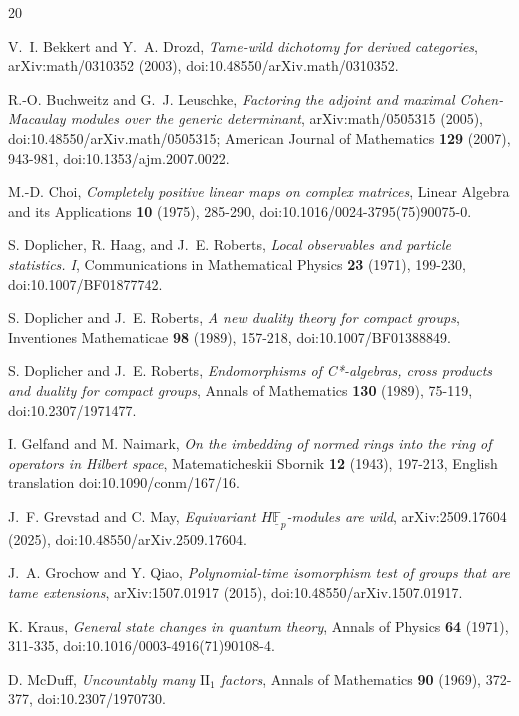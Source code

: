\documentclass[11pt,letterpaper]{article}
\theoremstyle{definition}
\theoremstyle{remark}
\begin{document}
\begin{thebibliography}{20}

V.~I. Bekkert and Y.~A. Drozd,
\emph{Tame-wild dichotomy for derived categories},
arXiv:math/0310352 (2003), doi:10.48550/arXiv.math/0310352.

R.-O. Buchweitz and G.~J. Leuschke,
\emph{Factoring the adjoint and maximal Cohen-Macaulay modules over the generic determinant},
arXiv:math/0505315 (2005), doi:10.48550/arXiv.math/0505315; American Journal of Mathematics \textbf{129} (2007), 943-981, doi:10.1353/ajm.2007.0022.

M.-D. Choi,
\emph{Completely positive linear maps on complex matrices},
Linear Algebra and its Applications \textbf{10} (1975), 285-290, doi:10.1016/0024-3795(75)90075-0.

S. Doplicher, R. Haag, and J.~E. Roberts,
\emph{Local observables and particle statistics. I},
Communications in Mathematical Physics \textbf{23} (1971), 199-230, doi:10.1007/BF01877742.

S. Doplicher and J.~E. Roberts,
\emph{A new duality theory for compact groups},
Inventiones Mathematicae \textbf{98} (1989), 157-218, doi:10.1007/BF01388849.

S. Doplicher and J.~E. Roberts,
\emph{Endomorphisms of C*-algebras, cross products and duality for compact groups},
Annals of Mathematics \textbf{130} (1989), 75-119, doi:10.2307/1971477.

I. Gelfand and M. Naimark,
\emph{On the imbedding of normed rings into the ring of operators in Hilbert space},
Matematicheskii Sbornik \textbf{12} (1943), 197-213, English translation doi:10.1090/conm/167/16.

J.~F. Grevstad and C. May,
\emph{Equivariant $H\underline{\mathbb{F}}_p$-modules are wild},
arXiv:2509.17604 (2025), doi:10.48550/arXiv.2509.17604.

J.~A. Grochow and Y. Qiao,
\emph{Polynomial-time isomorphism test of groups that are tame extensions},
arXiv:1507.01917 (2015), doi:10.48550/arXiv.1507.01917.

K. Kraus,
\emph{General state changes in quantum theory},
Annals of Physics \textbf{64} (1971), 311-335, doi:10.1016/0003-4916(71)90108-4.

D. McDuff,
\emph{Uncountably many $\mathrm{II}_1$ factors},
Annals of Mathematics \textbf{90} (1969), 372-377, doi:10.2307/1970730.


\end{thebibliography}
\end{document}

